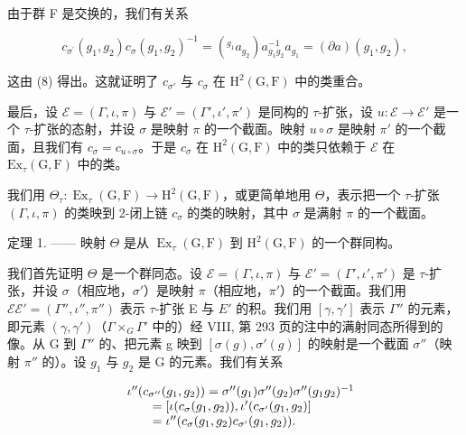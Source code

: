 由于群 F 是交换的，我们有关系

\[
c _ {\sigma^ {\prime}} (g _ {1}, g _ {2}) c _ {\sigma} (g _ {1}, g _ {2}) ^ {- 1} = (^ {g _ {1}} a _ {g _ {2}}) a _ {g _ {1} g _ {2}} ^ {- 1} a _ {g _ {1}} = (\partial a) (g _ {1}, g _ {2}),\tag{11}
\]

这由 (8) 得出。这就证明了 \(c_{\sigma'}\) 与 \(c_{\sigma}\) 在 \(\mathrm{H}^2(\mathrm{G},\mathrm{F})\) 中的类重合。

最后，设 \(\mathcal{E} = (\Gamma, \iota, \pi)\) 与 \(\mathcal{E}' = (\Gamma', \iota', \pi')\) 是同构的 \(\tau\)-扩张，设 \(u: \mathcal{E} \to \mathcal{E}'\) 是一个 \(\tau\)-扩张的态射，并设 \(\sigma\) 是映射 \(\pi\) 的一个截面。映射 \(u \circ \sigma\) 是映射 \(\pi'\) 的一个截面，且我们有 \(c_{\sigma} = c_{u \circ \sigma}\)。于是 \(c_{\sigma}\) 在 \(\mathrm{H}^2(\mathrm{G}, \mathrm{F})\) 中的类只依赖于 \(\mathcal{E}\) 在 \(\mathrm{Ex}_{\tau}(\mathrm{G}, \mathrm{F})\) 中的类。

我们用 \(\Theta_{\tau}: \operatorname{Ex}_{\tau}(\mathrm{G},\mathrm{F}) \to \mathrm{H}^{2}(\mathrm{G},\mathrm{F})\)，或更简单地用 \(\Theta\)，表示把一个 \(\tau\)-扩张 \((\Gamma,\iota,\pi)\) 的类映到 2-闭上链 \(c_{\sigma}\) 的类的映射，其中 \(\sigma\) 是满射 \(\pi\) 的一个截面。

定理 1. —— 映射 \(\Theta\) 是从 \(\operatorname{Ex}_{\tau}(\mathrm{G},\mathrm{F})\) 到 \(\mathrm{H}^2 (\mathrm{G},\mathrm{F})\) 的一个群同构。

我们首先证明 \(\Theta\) 是一个群同态。设 \(\mathcal{E} = (\Gamma, \iota, \pi)\) 与 \(\mathcal{E}' = (\Gamma', \iota', \pi')\) 是 \(\tau\)-扩张，并设 \(\sigma\)（相应地，\(\sigma'\)）是映射 \(\pi\)（相应地，\(\pi'\)）的一个截面。我们用 \(\mathcal{E}\mathcal{E}' = (\Gamma'', \iota'', \pi'')\) 表示 \(\tau\)-扩张 E 与 \(E'\) 的积。我们用 \([\gamma, \gamma']\) 表示 \(\Gamma''\) 的元素，即元素 \((\gamma, \gamma')\)（\(\Gamma \times_{G} \Gamma'\) 中的）经 VIII, 第 293 页的注中的满射同态所得到的像。从 G 到 \(\Gamma''\) 的、把元素 g 映到 \([\sigma(g), \sigma'(g)]\) 的映射是一个截面 \(\sigma''\)（映射 \(\pi''\) 的）。设 \(g_1\) 与 \(g_2\) 是 G 的元素。我们有关系

\[
\begin{array}{r l} & {\iota^ {\prime \prime} (c _ {\sigma^ {\prime \prime}} (g _ {1}, g _ {2})) = \sigma^ {\prime \prime} (g _ {1}) \sigma^ {\prime \prime} (g _ {2}) \sigma^ {\prime \prime} (g _ {1} g _ {2}) ^ {- 1}} \\ & {\qquad = [ \iota (c _ {\sigma} (g _ {1}, g _ {2})), \iota^ {\prime} (c _ {\sigma^ {\prime}} (g _ {1}, g _ {2}) ]} \\ & {\qquad = \iota^ {\prime \prime} (c _ {\sigma} (g _ {1}, g _ {2}) c _ {\sigma^ {\prime}} (g _ {1}, g _ {2})).} \end{array}
\]

